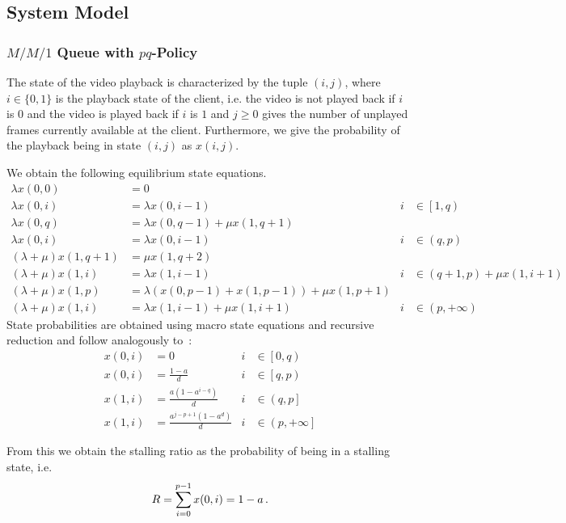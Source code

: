 \subsection{System Model}\label{sec:application:qoe_user_behaviour:system_model}
\subsubsection*{\(M/M/1\) Queue with \(pq\)-Policy}\label{sec:application:qoe_user_behaviour:system_model:mm1pq}
The state of the video playback is characterized by the tuple \((i, j)\), where \(i \in \{0, 1\}\) is the playback state of the client, i.e. the video is not played back if \(i\) is \(0\) and the video is played back if $i$ is $1$ and $j \geq 0$ gives the number of unplayed frames currently available at the client.
Furthermore, we give the probability of the playback being in state \((i, j)\) as \(x(i, j)\).

We obtain the following equilibrium state equations.
\begin{align*}
  \lambda x(0, 0) &= 0 & &\\
  \lambda x(0, i) &= \lambda x(0, i-1) & i&\in \left[1, q\right)\\
  \lambda x(0, q) &= \lambda x(0, q-1) + \mu x(1, q+1) & &\\
  \lambda x(0, i) &= \lambda x(0, i-1) & i&\in\left(q, p\right)\\
  (\lambda + \mu) x(1, q+1) &= \mu x(1, q+2) & &\\
  (\lambda + \mu) x(1, i) &= \lambda x(1, i-1) & i&\in\left(q+1, p\right) + \mu x(1, i+1) & &\\
  (\lambda + \mu) x(1, p) &= \lambda (x(0,p-1) + x(1, p-1)) + \mu x(1, p+1) & &\\
  (\lambda + \mu) x(1, i) &= \lambda x(1, i-1) + \mu x(1, i+1) & i&\in\left(p, +\infty\right)
\end{align*}
State probabilities are obtained using macro state equations and recursive reduction and follow analogously to~\cite{Zhang2004}:
\begin{align*}
x(0, i) &= 0 & i&\in \left[0,q\right)\\ 
x(0, i) &= \frac{1-a}{d} &i&\in \left[q,p\right)\\
x(1, i) &= \frac{a(1- a^{i-q})}{d} &i&\in \left(q,p\right]\\
x(1, i) &= \frac{a^{j-p+1}(1-a^{d})}{d} &i&\in \left(p,+\infty\right]
\end{align*}

From this we obtain the stalling ratio \stallingRatio as the probability of being in a stalling state, i.e.
\begin{equation}
R = \sum_{i=0}^{p-1} x(0, i) = 1-a \, .
\label{eq:application:qoe_user_behaviour:system_model:mm1pq:stalling_ratio_queuing}
\end{equation}

